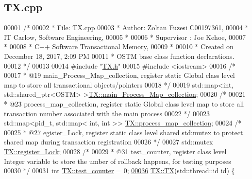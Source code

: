 \hypertarget{_t_x_8cpp_source}{}\subsection{T\+X.\+cpp}

\begin{DoxyCode}
00001 \textcolor{comment}{/* }
00002 \textcolor{comment}{ * File:   TX.cpp}
00003 \textcolor{comment}{ * Author: Zoltan Fuzesi C00197361, }
00004 \textcolor{comment}{ * IT Carlow, Software Engineering, }
00005 \textcolor{comment}{ *}
00006 \textcolor{comment}{ * Supervisor : Joe Kehoe, }
00007 \textcolor{comment}{ *}
00008 \textcolor{comment}{ * C++ Software Transactional Memory, }
00009 \textcolor{comment}{ * }
00010 \textcolor{comment}{ * Created on December 18, 2017, 2:09 PM}
00011 \textcolor{comment}{ * OSTM base class function declarations.}
00012 \textcolor{comment}{ */}
00013 
00014 \textcolor{preprocessor}{#include "\hyperlink{_t_x_8h}{TX.h}"}
00015 \textcolor{preprocessor}{#include <iostream>}
00016 \textcolor{comment}{/*}
00017 \textcolor{comment}{ * @19 main\_Process\_Map\_collection, register static Global class level map to store all transactional
       objects/pointers}
00018 \textcolor{comment}{ */}
00019 std::map<int, std::shared\_ptr<OSTM> >\hyperlink{class_t_x_a1a45d726894190695314464d7cd97c29_a1a45d726894190695314464d7cd97c29}{TX::main\_Process\_Map\_collection};
00020 \textcolor{comment}{/*}
00021 \textcolor{comment}{ * @23 process\_map\_collection, register static Global class level map to store all transaction number
       associated with the main process}
00022 \textcolor{comment}{ */}
00023 std::map<pid\_t, std::map< int, int >> \hyperlink{class_t_x_a2e3cd2f52fd93cf6ef3eb3c1cb830b9f_a2e3cd2f52fd93cf6ef3eb3c1cb830b9f}{TX::process\_map\_collection};
00024 \textcolor{comment}{/*}
00025 \textcolor{comment}{ * @27 egister\_Lock, register static class level shared std:mutex to protect shared map during transaction
       registration}
00026 \textcolor{comment}{ */}
00027 std::mutex \hyperlink{class_t_x_aa688a8c96fa3cdf8cd92e267463536dc_aa688a8c96fa3cdf8cd92e267463536dc}{TX::register\_Lock};
00028 \textcolor{comment}{/*}
00029 \textcolor{comment}{ * @31 test\_counter, register class level Integer variable to store the umber of rollback happens, for
       testing purposes}
00030 \textcolor{comment}{ */}
00031 \textcolor{keywordtype}{int} \hyperlink{class_t_x_a25838234aab99ae891a90eb8623a8b3c_a25838234aab99ae891a90eb8623a8b3c}{TX::test\_counter} = 0;
\hypertarget{_t_x_8cpp_source.tex_l00036}{}\hyperlink{class_t_x_a8a4b83eab0171ae834bfa92bbced1094_a8a4b83eab0171ae834bfa92bbced1094}{00036} \hyperlink{class_t_x_a8a4b83eab0171ae834bfa92bbced1094_a8a4b83eab0171ae834bfa92bbced1094}{TX::TX}(std::thread::id \textcolor{keywordtype}{id}) \{

\end{DoxyCode}
